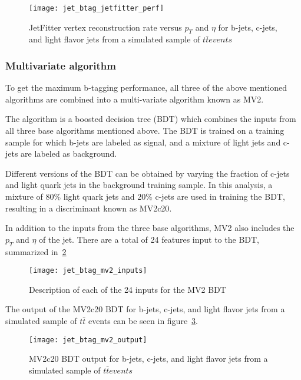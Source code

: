 \begin{figure}[!ht]
    \centering
\texttt{[image: jet\_btag\_jetfitter\_perf]}
\caption{JetFitter vertex reconstruction rate versus $p_T$ and $\eta$ for b-jets, c-jets, and light flavor jets
from a simulated sample of $t\bar{t} events$}
\label{fig:jet_btag_jetfitter_perf}
\end{figure}\cite{jet-btag-mv2}

\subsubsection{Multivariate algorithm}\label{subsubsec:jet_btag_mv2}

To get the maximum b-tagging performance, all three of the above mentioned algorithms are combined into a multi-variate
algorithm known as MV2.

The algorithm is a boosted decision tree (BDT) which combines the inputs from all three base algorithms mentioned above.
The BDT is trained on a training sample for which b-jets are labeled as signal, and a mixture of light jets and
c-jets are labeled as background\cite{jet-btag-mv2}.

Different versions of the BDT can be obtained by varying the fraction of c-jets and light quark jets in the background
training sample.
In this analysis, a mixture of 80\% light quark jets and 20\% c-jets are used in training the BDT, resulting
in a discriminant known as MV2c20\cite{jet-btag-mv2}.

In addition to the inputs from the three base algorithms, MV2 also includes the $p_T$ and $\eta$ of the jet.
There are a total of 24 features input to the BDT, summarized in~\ref{fig:jet_btag_mv2_inputs}

\begin{figure}[!ht]
    \centering
\texttt{[image: jet\_btag\_mv2\_inputs]}
\caption{Description of each of the 24 inputs for the MV2 BDT}
\label{fig:jet_btag_mv2_inputs}
\end{figure}\cite{jet-btag-mv2}

The output of the MV2c20 BDT for b-jets, c-jets, and light flavor jets from a simulated sample of $t\bar{t}$ events
can be seen in figure~\ref{fig:jet_btag_mv2_output}.

\begin{figure}[!ht]
    \centering
\texttt{[image: jet\_btag\_mv2\_output]}
\caption{MV2c20 BDT output for b-jets, c-jets, and light flavor jets from a simulated sample of $t\bar{t} events$}
\label{fig:jet_btag_mv2_output}
\end{figure}\cite{jet-btag-mv2}

